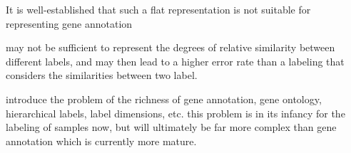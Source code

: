 \cite{go,so,mo,obo}


It is well-established that such a flat representation is not suitable for representing gene annotation \cite{go}

 may not be sufficient to represent the degrees of
relative similarity between different labels, and may then lead to a higher
error rate than a labeling that considers the similarities between two label.





introduce the problem of the richness of gene annotation, gene ontology,
hierarchical labels, label dimensions, etc.  this problem is in its infancy for
the labeling of samples now, but will ultimately be far more complex than gene
annotation which is currently more mature.








